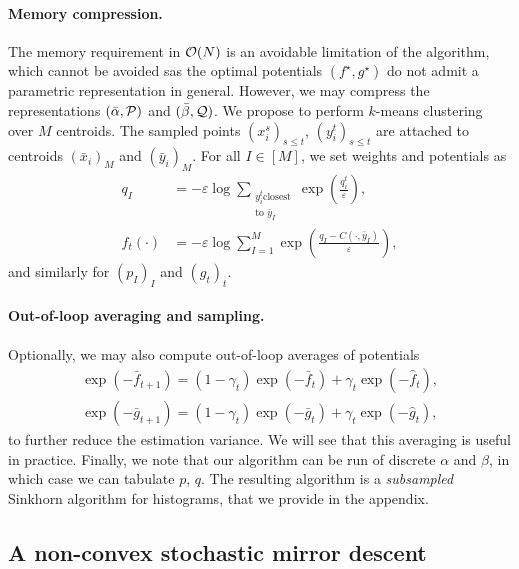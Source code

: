 \paragraph{Memory compression.} The memory requirement in $\mathcal{O}(N)$ is an
avoidable limitation of the algorithm, which cannot be avoided sas the optimal
potentials $(f^\star, g^\star)$ do not admit a parametric representation in
general. However, we may compress the representations $(\bar \alpha, \mathcal{P})$ and
$(\bar \beta, \mathcal{Q})$. We propose to perform $k$-means clustering over $M$
centroids. The sampled points $(x_i^s)_{s\leq t}$, $(y_i^t)_{s\leq t}$ are
attached to centroids ${(\bar x_i)}_M$ and ${(\bar y_i)}_M$. For all $I \in
[M]$, we set weights and potentials as
\begin{align}
    q_I &= - \varepsilon \log \sum_{\substack{y_i^t \text{closest}\\\text{to } \bar y_I}}
     \exp(\frac{q_i^t}{\varepsilon}),\\
    f_t(\cdot) &= - \varepsilon \log\sum_{I=1}^M \exp(\frac{q_I - C(\cdot, \bar y_I)}{\varepsilon}),
\end{align}
and similarly for $(p_I)_I$ and ${(g_t)}_t$.

\paragraph{Out-of-loop averaging and sampling.} Optionally, we may also
compute out-of-loop averages of potentials
\begin{align}
    \exp(-\bar f_{t+1}) = (1 - \gamma_t) \exp(-\bar f_t) + \gamma_t \exp(-\hat f_t), \\
    \exp(-\bar g_{t+1}) = (1 - \gamma_t) \exp(-\bar g_t) + \gamma_t \exp(-\hat g_t),
\end{align}
to further reduce the estimation variance. We will see that this averaging is
useful in practice. Finally, we note that our algorithm can be run of discrete
$\alpha$ and $\beta$, in which case we can tabulate $p$, $q$. The resulting
algorithm is a \textit{subsampled} Sinkhorn algorithm for histograms, that we provide in the
appendix.

\subsection{A non-convex stochastic mirror descent}

